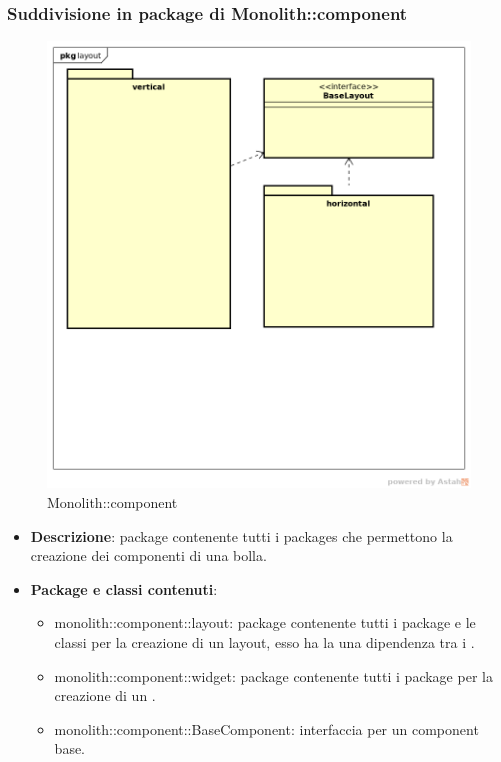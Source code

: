 \subsubsection{Suddivisione in package  di Monolith::component}
\label{Monolith::component}
\begin{figure}[H]
	\centering
	\includegraphics[scale=0.5]{Sezioni/imgPackage/component.png}
	\caption{Monolith::component}
\end{figure}
\begin{itemize}
	\item{\textbf{Descrizione}}: package contenente tutti i packages che permettono la creazione dei componenti di una bolla.
	\item{\textbf{Package e classi contenuti}}:
	\begin{itemize}
	\item{monolith::component::layout}: package contenente tutti i package e le classi per la creazione di un layout, esso ha la una dipendenza tra i .
	\item{monolith::component::widget}: package contenente tutti i package per la creazione di un .
	\item{monolith::component::BaseComponent}: interfaccia per un component base.
	\end{itemize}

\end{itemize}

